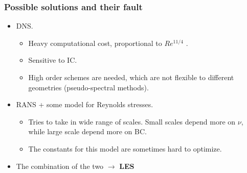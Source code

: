 \documentclass{beamer}
\begin{document}
\begin{frame}
  \frametitle{Possible solutions and their fault}
  \begin{itemize}
    \item<1-> DNS. 
      \begin{itemize}
        \item<2-> Heavy computational cost, proportional to $Re^{11/4}$ \cite{zouLARGEEDDYSIMULATION2006}.
        \item<3-> Sensitive to IC.
        \item<4-> High order schemes are needed, which are not flexible 
        to different geometries (pseudo-spectral methods).
      \end{itemize}
    \item<5-> RANS + some model for Reynolds stresses. 
      \begin{itemize}
        \item<6-> Tries to take in wide range of scales. Small scales depend 
        more on $\nu$, while large scale depend more on BC.
        \item<7-> The constants for this model are sometimes hard to optimize.  
      \end{itemize}
    \item<8-> The combination of the two $\rightarrow$ \textbf{LES}
\end{itemize}
\end{frame}
\end{document}
